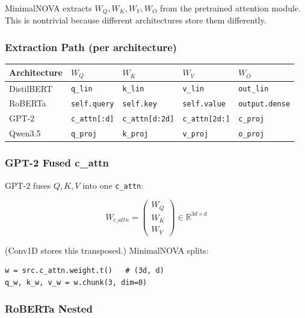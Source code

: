 MinimalNOVA extracts $W_Q, W_K, W_V, W_O$ from the pretrained attention 
module. This is nontrivial because different architectures store them 
differently.

\subsubsection{Extraction Path (per architecture)}

\begin{table}[H]
\centering
\small
\begin{tabular}{lllll}
\toprule
\textbf{Architecture} & \textbf{$W_Q$} & \textbf{$W_K$} & \textbf{$W_V$} & \textbf{$W_O$} \\
\midrule
DistilBERT & \texttt{q\_lin} & \texttt{k\_lin} & \texttt{v\_lin} & \texttt{out\_lin} \\
RoBERTa & \texttt{self.query} & \texttt{self.key} & \texttt{self.value} & \texttt{output.dense} \\
GPT-2 & \texttt{c\_attn[:d]} & \texttt{c\_attn[d:2d]} & \texttt{c\_attn[2d:]} & \texttt{c\_proj} \\
Qwen3.5 & \texttt{q\_proj} & \texttt{k\_proj} & \texttt{v\_proj} & \texttt{o\_proj} \\
\bottomrule
\end{tabular}
\end{table}

\subsubsection{GPT-2 Fused c\_attn}

GPT-2 fuses $Q, K, V$ into one \texttt{c\_attn}:

\[
W_{c\_attn} = \begin{pmatrix} W_Q \\ W_K \\ W_V \end{pmatrix} \in \mathbb{R}^{3d \times d}
\tag{4.6}
\]

(Conv1D stores this transposed.) MinimalNOVA splits:

\begin{lstlisting}
w = src.c_attn.weight.t()   # (3d, d)
q_w, k_w, v_w = w.chunk(3, dim=0)
\end{lstlisting}

\subsubsection{RoBERTa Nested}

